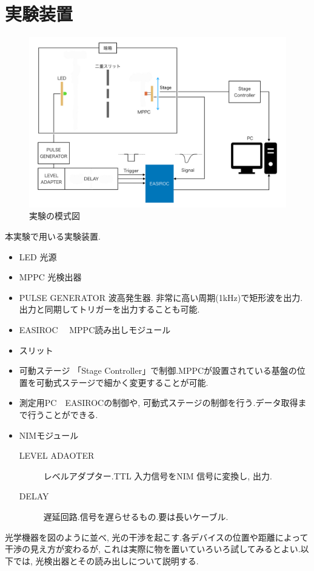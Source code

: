 
\section{実験装置}
\begin{figure}[h]
  \begin{center}
    \includegraphics[width=12cm]{../setup_2021.jpeg}
  \end{center}
  \caption{実験の模式図}
\end{figure}

本実験で用いる実験装置.
\begin{itemize}
	\item LED 光源
	\item MPPC 光検出器
	\item PULSE GENERATOR 波高発生器. 非常に高い周期(1kHz)で矩形波を出力.出力と同期してトリガーを出力することも可能.
	\item EASIROC　 MPPC読み出しモジュール
	\item スリット　 
	\item 可動ステージ 「Stage Controller」で制御.MPPCが設置されている基盤の位置を可動式ステージで細かく変更することが可能.
	 \item 測定用PC　EASIROCの制御や, 可動式ステージの制御を行う.データ取得まで行うことができる.
	 \item NIMモジュール
\begin{description}
  		\item[LEVEL ADAOTER] レベルアダプター.TTL 入力信号をNIM 信号に変換し, 出力.
  		\item[DELAY] 遅延回路.信号を遅らせるもの.要は長いケーブル.
\end{description}
\end{itemize}
光学機器を図のように並べ, 光の干渉を起こす.各デバイスの位置や距離によって干渉の見え方が変わるが, これは実際に物を置いていろいろ試してみるとよい.以下では, 光検出器とその読み出しについて説明する.

